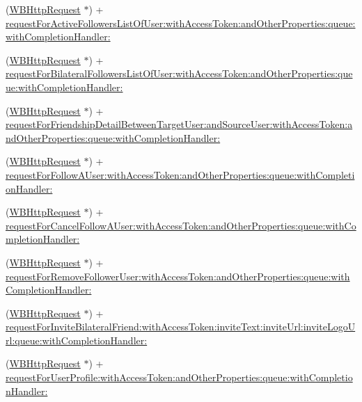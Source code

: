 \begin{DoxyCompactItemize}
\item 
(\mbox{\hyperlink{interface_w_b_http_request}{W\+B\+Http\+Request}} $\ast$) + \mbox{\hyperlink{category_w_b_http_request_07_weibo_user_08_a158110b5d079d1ddd7baae029a8a36fb}{request\+For\+Active\+Followers\+List\+Of\+User\+:with\+Access\+Token\+:and\+Other\+Properties\+:queue\+:with\+Completion\+Handler\+:}}
\item 
(\mbox{\hyperlink{interface_w_b_http_request}{W\+B\+Http\+Request}} $\ast$) + \mbox{\hyperlink{category_w_b_http_request_07_weibo_user_08_a5c4b501746e378232db99ae045e49889}{request\+For\+Bilateral\+Followers\+List\+Of\+User\+:with\+Access\+Token\+:and\+Other\+Properties\+:queue\+:with\+Completion\+Handler\+:}}
\item 
(\mbox{\hyperlink{interface_w_b_http_request}{W\+B\+Http\+Request}} $\ast$) + \mbox{\hyperlink{category_w_b_http_request_07_weibo_user_08_a6e438b749b6311301808d7ae0923d7c3}{request\+For\+Friendship\+Detail\+Between\+Target\+User\+:and\+Source\+User\+:with\+Access\+Token\+:and\+Other\+Properties\+:queue\+:with\+Completion\+Handler\+:}}
\item 
(\mbox{\hyperlink{interface_w_b_http_request}{W\+B\+Http\+Request}} $\ast$) + \mbox{\hyperlink{category_w_b_http_request_07_weibo_user_08_a857eebccc3b26b8d7c5bbc38a3ae2627}{request\+For\+Follow\+A\+User\+:with\+Access\+Token\+:and\+Other\+Properties\+:queue\+:with\+Completion\+Handler\+:}}
\item 
(\mbox{\hyperlink{interface_w_b_http_request}{W\+B\+Http\+Request}} $\ast$) + \mbox{\hyperlink{category_w_b_http_request_07_weibo_user_08_a0a601918d65f1776f99882facc1349e3}{request\+For\+Cancel\+Follow\+A\+User\+:with\+Access\+Token\+:and\+Other\+Properties\+:queue\+:with\+Completion\+Handler\+:}}
\item 
(\mbox{\hyperlink{interface_w_b_http_request}{W\+B\+Http\+Request}} $\ast$) + \mbox{\hyperlink{category_w_b_http_request_07_weibo_user_08_abb1e37b606f28ab890279b1ce62de963}{request\+For\+Remove\+Follower\+User\+:with\+Access\+Token\+:and\+Other\+Properties\+:queue\+:with\+Completion\+Handler\+:}}
\item 
(\mbox{\hyperlink{interface_w_b_http_request}{W\+B\+Http\+Request}} $\ast$) + \mbox{\hyperlink{category_w_b_http_request_07_weibo_user_08_a82d133ab6df8bbd0b61a6bbdd56fa499}{request\+For\+Invite\+Bilateral\+Friend\+:with\+Access\+Token\+:invite\+Text\+:invite\+Url\+:invite\+Logo\+Url\+:queue\+:with\+Completion\+Handler\+:}}
\item 
(\mbox{\hyperlink{interface_w_b_http_request}{W\+B\+Http\+Request}} $\ast$) + \mbox{\hyperlink{category_w_b_http_request_07_weibo_user_08_ac5c54cd942ec3972dce639a4a299d812}{request\+For\+User\+Profile\+:with\+Access\+Token\+:and\+Other\+Properties\+:queue\+:with\+Completion\+Handler\+:}}

\end{DoxyCompactItemize}
